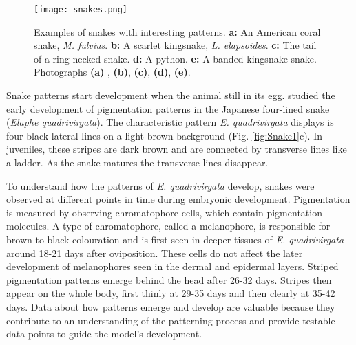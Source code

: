 \begin{figure}[hb]
	\centering
	\texttt{[image: snakes.png]}
	\caption[Examples of snakes with interesting patterns]{Examples of snakes with interesting patterns. \textbf{a:} An American coral snake, \textit{M. fulvius}. \textbf{b:} A scarlet kingsnake, \textit{L. elapsoides}. \textbf{c:} The tail of a ring-necked snake. \textbf{d:} A python. \textbf{e:} A banded kingsnake snake. Photographs \textbf{(a)} , \textbf{(b)}, \textbf{(c)}, \textbf{(d)}, \textbf{(e)}.}
	\label{fig:realSnakePatterns}
\end{figure}


Snake patterns start development when the animal still in its egg. \citet{murakami2018} studied the early development of pigmentation patterns in the Japanese four-lined snake (\textit{Elaphe quadrivirgata}). The characteristic pattern \textit{E. quadrivirgata} displays is four black lateral lines on a light brown background (Fig. \ref{fig:Snake1}c). In juveniles, these stripes are dark brown and are connected by transverse lines like a ladder. As the snake matures the transverse lines disappear.
 
To understand how the patterns of \textit{E. quadrivirgata} develop, snakes were observed at different points in time during embryonic development. Pigmentation is measured by observing chromatophore cells, which contain pigmentation molecules. A type of chromatophore, called a melanophore, is responsible for brown to black colouration and is first seen in deeper tissues of \textit{E. quadrivirgata} around 18-21 days after oviposition. These cells do not affect the later development of melanophores seen in the dermal and epidermal layers. Striped pigmentation patterns emerge behind the head after 26-32 days. Stripes then appear on the whole body, first thinly at 29-35 days and then clearly at 35-42 days. Data about how patterns emerge and develop are valuable because they contribute to an understanding of the patterning process and provide testable data points to guide the model's development.

